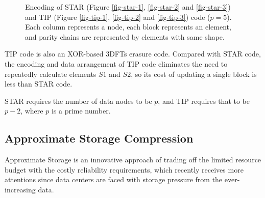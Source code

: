 \documentclass[sigconf]{acmart}
\begin{document}
\begin{figure}[!ht]
\hspace{5pt}
\caption{Encoding of STAR (Figure \ref{fig-star-1}, \ref{fig-star-2} and \ref{fig-star-3}) and TIP (Figure \ref{fig-tip-1}, \ref{fig-tip-2} and \ref{fig-tip-3}) code ($p = 5$). Each column represents a node, each block represents an element, and parity chains are represented by elements with same shape.}
\label{fig-star-tip}
\end{figure}

TIP code is also an XOR-based 3DFTs erasure code.
Compared with STAR code, the encoding and data arrangement of TIP code eliminates the need to repeatedly calculate elements $S1$ and $S2$, so its cost of updating a single block is less than STAR code.

STAR requires the number of data nodes to be $p$, and TIP requires that to be $p-2$, where $p$ is a prime number.


\subsection{Approximate Storage \textcolor[rgb]{1.00,0.00,0.00}{Compression}}
Approximate Storage is an innovative approach of trading off the limited resource budget with the costly reliability requirements, which recently receives more attentions since data centers are faced with storage pressure from the ever-increasing data.
\end{document}
